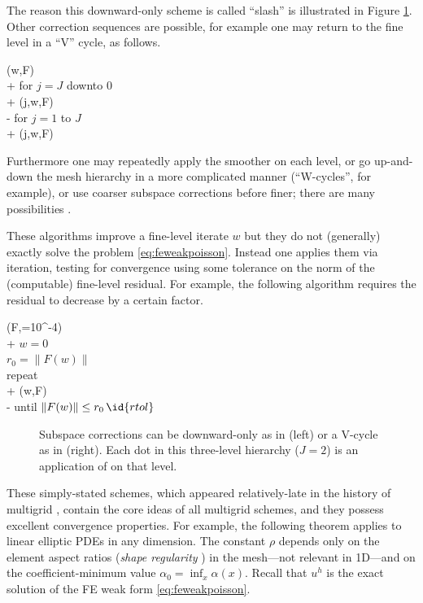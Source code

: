 \documentclass[letterpaper,final,12pt,reqno]{amsart}
\theoremstyle{claim}
\numberwithin{equation}{section}
\numberwithin{figure}{section}
\numberwithin{table}{section}
\begin{document}
The reason this downward-only scheme is called ``slash'' is illustrated in Figure \ref{fig:msccycles}.  Other correction sequences are possible, for example one may return to the fine level in a ``V'' cycle, as follows.
\begin{pseudo*}
(w,F)\text{:} \\+
    for $j=J$ downto $0$ \\+
        (j,w,F) \\-
    for $j=1$ to $J$ \\+
        (j,w,F)
\end{pseudo*}
Furthermore one may repeatedly apply the smoother on each level, or go up-and-down the mesh hierarchy in a more complicated manner (``W-cycles'', for example), or use coarser subspace corrections before finer; there are many possibilities \cite{Trottenbergetal2001}.

These  algorithms improve a fine-level iterate $w$ but they do not (generally) exactly solve the problem \eqref{eq:feweakpoisson}.  Instead one applies them via iteration, testing for convergence using some tolerance on the norm of the (computable) fine-level residual.  For example, the following algorithm requires the residual to decrease by a certain factor.
\begin{pseudo*}
(F,=10^{-4})\text{:} \\+
    $w=0$ \qquad\qquad\qquad\qquad\qquad {} \\
    $r_0 = \|F(w)\|$ \\
    repeat \\+
        (w,F) \qquad\qquad {} \\-
    until $\|F(w)\| \le r_0\, \id{rtol}$
\end{pseudo*}

\begin{figure}

\caption{Subspace corrections can be downward-only as in  (left) or a V-cycle as in  (right).  Each dot in this three-level hierarchy ($J=2$) is an application of  on that level.}
\label{fig:msccycles}
\end{figure}

These simply-stated schemes, which appeared relatively-late in the history of multigrid \cite{Xu1992}, contain the core ideas of all multigrid schemes, and they possess excellent convergence properties.  For example, the following theorem applies to linear elliptic PDEs in any dimension.  The constant $\rho$ depends only on the element aspect ratios (\emph{shape regularity} \cite{Elmanetal2014}) in the mesh---not relevant in 1D---and on the coefficient-minimum value $\alpha_0=\inf_x \alpha(x)$.  Recall that $u^h$ is the exact solution of the FE weak form \eqref{eq:feweakpoisson}.
\end{document}
